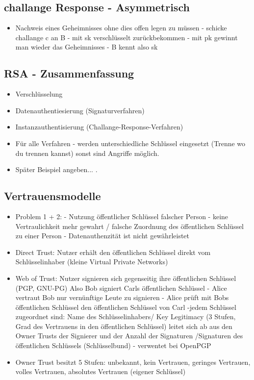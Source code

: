 \documentclass[a4paper,10pt]{scrartcl}
\begin{document}
       \subsection{ challange Response - Asymmetrisch}
       \begin{itemize}
        \item Nachweis eines Geheimnisses ohne dies offen legen zu müssen - schicke challange c an B - mit sk verschlüsselt zurückbekommen - mit pk gewinnt man wieder das Geheimnisses
        - B kennt also sk
       \end{itemize}
        \subsection{ RSA - Zusammenfassung}
        \begin{itemize}
         \item Verschlüsselung
         \item Datenauthentiesierung (Signaturverfahren)
         \item Instanzauthentisierung (Challange-Response-Verfahren)
         \item Für alle Verfahren - werden unterschiedliche Schlüssel eingesetzt (Trenne wo du trennen kannst) sonst sind Angriffe möglich.
         \item Später Beispiel angeben... .
        \end{itemize}
        \subsection{ Vertrauensmodelle }
        \begin{itemize}
         \item Problem 1 + 2: - Nutzung öffentlicher Schlüssel falscher Person - keine Vertraulichkeit mehr gewahrt / falsche Zuordnung des öffentlichen Schlüssel 
         zu einer Person - Datenauthenzität ist nicht gewährleistet
         \item Direct Trust: Nutzer erhält den öffentlichen Schlüssel direkt vom Schlüsselinhaber (kleine Virtual Private Networks)
         \item Web of Trust: Nutzer signieren sich gegenseitig ihre öffentlichen Schlüssel (PGP, GNU-PG) Also Bob signiert Carls öffentlichen Schlüssel - Alice
         vertraut Bob nur vernünftige Leute zu signieren - Alice prüft mit Bobs öffentlichen Schlüssel den öffentlichen Schlüssel von Carl -jedem Schlüssel zugeordnet sind:
         Name des Schlüsselinhabers/ Key Legitimacy (3 Stufen, Grad des Vertrauens in den öffentlichen Schlüssel) leitet sich ab aus den Owner Trusts der Signierer und der Anzahl der Signaturen
         /Signaturen des öffentlichen Schlüssels (Schlüsselbund) - verwentet bei OpenPGP
         \item Owner Trust besitzt 5 Stufen: unbekannt, kein Vertrauen, geringes Vertrauen, volles Vertrauen, absolutes Vertrauen (eigener Schlüssel)
        \end{itemize}
\end{document}
